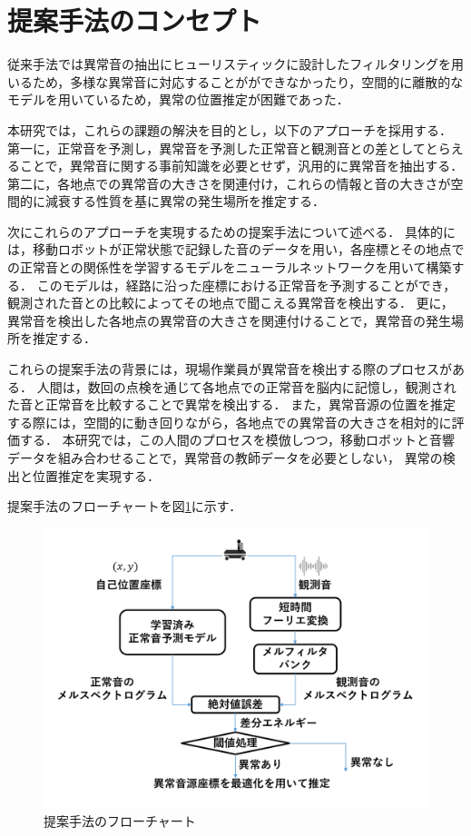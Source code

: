 \documentclass[../main]{subfiles}
\begin{document}
\section{提案手法のコンセプト}
\label{sec:pmethod_concept}
従来手法では異常音の抽出にヒューリスティックに設計したフィルタリングを用いるため，多様な異常音に対応することがができなかったり，空間的に離散的なモデルを用いているため，異常の位置推定が困難であった．

本研究では，これらの課題の解決を目的とし，以下のアプローチを採用する．
第一に，正常音を予測し，異常音を予測した正常音と観測音との差としてとらえることで，異常音に関する事前知識を必要とせず，汎用的に異常音を抽出する．
第二に，各地点での異常音の大きさを関連付け，これらの情報と音の大きさが空間的に減衰する性質を基に異常の発生場所を推定する．


次にこれらのアプローチを実現するための提案手法について述べる．
具体的には，移動ロボットが正常状態で記録した音のデータを用い，各座標とその地点での正常音との関係性を学習するモデルをニューラルネットワークを用いて構築する．
このモデルは，経路に沿った座標における正常音を予測することができ，観測された音との比較によってその地点で聞こえる異常音を検出する．
更に，異常音を検出した各地点の異常音の大きさを関連付けることで，異常音の発生場所を推定する．

これらの提案手法の背景には，現場作業員が異常音を検出する際のプロセスがある．
人間は，数回の点検を通じて各地点での正常音を脳内に記憶し，観測された音と正常音を比較することで異常を検出する．
また，異常音源の位置を推定する際には，空間的に動き回りながら，各地点での異常音の大きさを相対的に評価する．
本研究では，この人間のプロセスを模倣しつつ，移動ロボットと音響データを組み合わせることで，異常音の教師データを必要としない，
異常の検出と位置推定を実現する．

提案手法のフローチャートを図\ref{fig:flowchart}に示す．


\begin{figure}[t]
  \centering
  \includegraphics[keepaspectratio, width=1.0\linewidth]{chap3/flowchart_proposed_method.png}
  \caption{提案手法のフローチャート}
  \label{fig:flowchart}
\end{figure}
\end{document}

